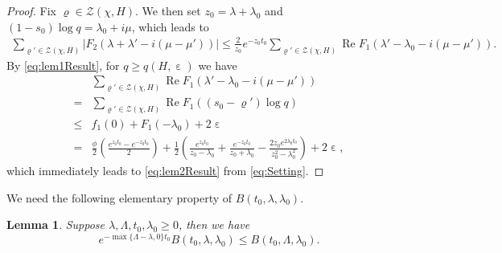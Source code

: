 \documentclass[10pt, reqno]{amsart}
\numberwithin{equation}{section}
\newtheorem{lemma}[theorem]{Lemma}
\renewcommand{\Re}{\operatorname{Re}}
\newcommand{\bb}[1]{\left(#1\right)}
\renewcommand{\epsilon }{\operatorname{\varepsilon}}
\renewcommand{\rho }{\operatorname{\varrho}}
\begin{document}
\begin{proof}
Fix $\rho \in \mathcal{Z}(\chi,H)$. We then set $z_0=\lambda+\lambda_0$ and $(1-s_0)\log q= \lambda_0+i\mu$, which leads to
\begin{equation}\label{eq:Setting}
\begin{split}
\sum_{\rho' \in \mathcal{Z}(\chi, H)} |F_2(\lambda+\lambda'-i(\mu-\mu'))| \leq \frac{2}{z_0}e^{-z_0t_0} \sum_{\rho' \in \mathcal{Z}(\chi, H)} \Re F_1(\lambda'-\lambda_0-i(\mu-\mu')).
\end{split}
\end{equation}
By \eqref{eq:lem1Result}, for $q\geq q(H,\epsilon)$ we have
\begin{equation}\label{eq:SumBound}
\begin{split}
& \sum_{\rho' \in \mathcal{Z}(\chi, H)} \Re F_1(\lambda'-\lambda_0-i(\mu-\mu')) \\
=& \sum_{\rho' \in \mathcal{Z}(\chi, H)} \Re F_1((s_0-\rho')\log q) \\
\leq & f_1(0)+F_1(-\lambda_0)+2\epsilon \\
=&\frac{\phi}{2}\bb{\frac{e^{z_0t_0}-e^{-z_0t_0}}{2}}+\frac{1}{2}\bb{\frac{e^{z_0 t_0}}{z_0-\lambda_0}+\frac{e^{-z_0 t_0}}{z_0+\lambda_0}-\frac{2z_0 e^{2\lambda_0t_0}}{z_0^2-\lambda_0^2}}+2\epsilon,
\end{split}
\end{equation}
which immediately leads to \eqref{eq:lem2Result} from \eqref{eq:Setting}.
\end{proof}

We need the following elementary property of $B(t_0,\lambda,\lambda_0)$.

\begin{lemma}\label{lem:3}
Suppose $\lambda,\Lambda, t_0,\lambda_0 \geq 0$, then we have
\begin{equation}\label{eq:lem3Result}
e^{-\max\{\Lambda-\lambda,0\}t_0}B(t_0,\lambda,\lambda_0)\leq B(t_0,\Lambda,\lambda_0).
\end{equation}
\end{lemma}
\end{document}
